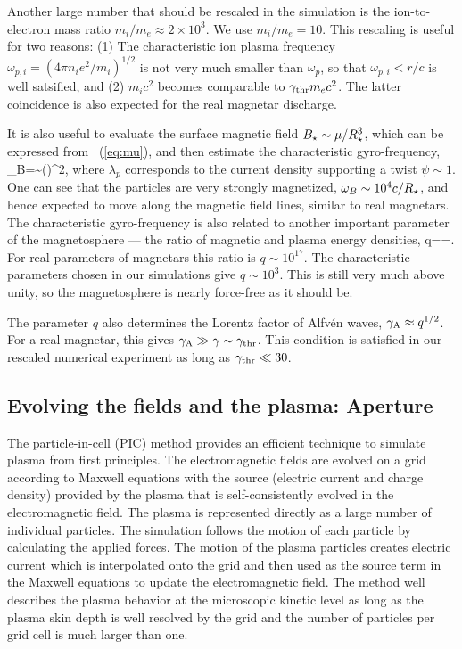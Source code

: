 Another large number that should
be
rescaled in the simulation is the ion-to-electron
mass ratio $m_i/m_e\approx 2\times 10^3$. We use $m_i/m_e=10$.
This rescaling is useful for two reasons:
(1) The characteristic ion plasma frequency $\omega_{p,i}=(4\pi n_i e^2/m_i)^{1/2}$
is not very much smaller than $\omega_p$, so that $\omega_{p,i}<r/c$ is well
satsified, and (2) $m_ic^2$ becomes comparable to
$\gamma_{\rm thr} m_ec^2$. The latter coincidence is also expected for the real magnetar discharge.

It is also useful to evaluate the surface magnetic field $B_\star\sim\mu/R_\star^3$, which can
be expressed from \Eq~(\ref{eq:mu}), and then estimate the characteristic gyro-frequency,
\beq
   \omega_B=\sim {}\left(\right)^2,
\eeq
where $\lambda_p$ corresponds to the current density supporting a twist $\psi\sim 1$.
One can see that the particles are very strongly magnetized, $\omega_B\sim 10^4 c/R_\star$,
and hence expected to move along the magnetic field lines, similar to real magnetars.
The characteristic gyro-frequency is also related to another important parameter of
the magnetosphere --- the ratio of magnetic and plasma energy densities,
\beq
   q==.
\eeq
For real parameters of magnetars this ratio is $q\sim 10^{17}$.
The characteristic parameters chosen in our simulations give $q\sim 10^3$.
This is still very much above unity, so the magnetosphere is nearly force-free as
it should be.

The parameter $q$ also determines the Lorentz factor of Alfv\'en waves,
$\gamma_{\rm A}\approx q^{1/2}$. For a real magnetar, this gives
$\gamma_{\rm A}\gg \gamma\sim\gamma_{\rm thr}$.
This condition is satisfied in our rescaled numerical experiment
 as long as $\gamma_{\rm thr}\ll 30$.


\subsection{Evolving the fields and the plasma: Aperture}
\label{sec:aperture}

The particle-in-cell (PIC) method provides an efficient technique to simulate plasma
from first principles. The electromagnetic fields are evolved on a grid according to
Maxwell equations with the source (electric current and charge density) provided by
the plasma that is self-consistently evolved in the electromagnetic field. The plasma is
represented directly as a large number of individual particles. The simulation follows
the motion of each particle by calculating the applied forces.
The motion of the plasma particles creates electric current which is interpolated onto the
grid and then used as the source term in the Maxwell equations to update
the electromagnetic field. The method well describes the plasma behavior at the
microscopic kinetic level as long as the plasma skin depth is well resolved by the grid
and the number of particles per grid cell is much larger than one.

